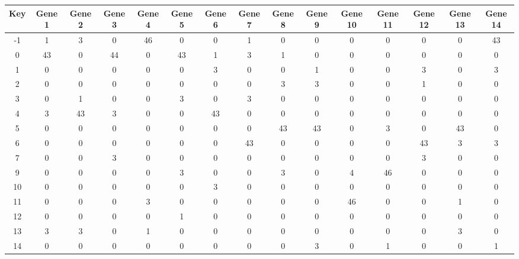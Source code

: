 \begin{tabular}{|c|c|c|c|c|c|c|c|c|c|c|c|c|c|c|}
\hline
Key & Gene 1 & Gene 2 & Gene 3 & Gene 4 & Gene 5 & Gene 6 & Gene 7 & Gene 8 & Gene 9 & Gene 10 & Gene 11 & Gene 12 & Gene 13 & Gene 14 \\
\hline
-1 & 1 & 3 & 0 & 46 & 0 & 0 & 1 & 0 & 0 & 0 & 0 & 0 & 0 & 43 \\
0 & 43 & 0 & 44 & 0 & 43 & 1 & 3 & 1 & 0 & 0 & 0 & 0 & 0 & 0 \\
1 & 0 & 0 & 0 & 0 & 0 & 3 & 0 & 0 & 1 & 0 & 0 & 3 & 0 & 3 \\
2 & 0 & 0 & 0 & 0 & 0 & 0 & 0 & 3 & 3 & 0 & 0 & 1 & 0 & 0 \\
3 & 0 & 1 & 0 & 0 & 3 & 0 & 3 & 0 & 0 & 0 & 0 & 0 & 0 & 0 \\
4 & 3 & 43 & 3 & 0 & 0 & 43 & 0 & 0 & 0 & 0 & 0 & 0 & 0 & 0 \\
5 & 0 & 0 & 0 & 0 & 0 & 0 & 0 & 43 & 43 & 0 & 3 & 0 & 43 & 0 \\
6 & 0 & 0 & 0 & 0 & 0 & 0 & 43 & 0 & 0 & 0 & 0 & 43 & 3 & 3 \\
7 & 0 & 0 & 3 & 0 & 0 & 0 & 0 & 0 & 0 & 0 & 0 & 3 & 0 & 0 \\
9 & 0 & 0 & 0 & 0 & 3 & 0 & 0 & 3 & 0 & 4 & 46 & 0 & 0 & 0 \\
10 & 0 & 0 & 0 & 0 & 0 & 3 & 0 & 0 & 0 & 0 & 0 & 0 & 0 & 0 \\
11 & 0 & 0 & 0 & 3 & 0 & 0 & 0 & 0 & 0 & 46 & 0 & 0 & 1 & 0 \\
12 & 0 & 0 & 0 & 0 & 1 & 0 & 0 & 0 & 0 & 0 & 0 & 0 & 0 & 0 \\
13 & 3 & 3 & 0 & 1 & 0 & 0 & 0 & 0 & 0 & 0 & 0 & 0 & 3 & 0 \\
14 & 0 & 0 & 0 & 0 & 0 & 0 & 0 & 0 & 3 & 0 & 1 & 0 & 0 & 1 \\
\hline
\end{tabular}